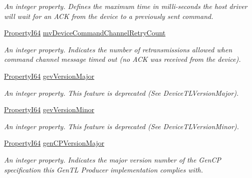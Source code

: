 \begin{DoxyCompactItemize}
\begin{DoxyCompactList}\small\item\em An integer property. Defines the maximum time in milli-\/seconds the host driver will wait for an A\+C\+K from the device to a previously sent command. \end{DoxyCompactList}\item 
\hyperlink{group___common_interface_ga81749b2696755513663492664a18a893}{Property\+I64} \hyperlink{classmv_i_m_p_a_c_t_1_1acquire_1_1_gen_i_cam_1_1_interface_module_aedcdf96599dc918cab683d9a9e915f64}{mv\+Device\+Command\+Channel\+Retry\+Count}
\begin{DoxyCompactList}\small\item\em An integer property. Indicates the number of retransmissions allowed when command channel message timed out (no A\+C\+K was received from the device). \end{DoxyCompactList}\item 
\hyperlink{group___common_interface_ga81749b2696755513663492664a18a893}{Property\+I64} \hyperlink{classmv_i_m_p_a_c_t_1_1acquire_1_1_gen_i_cam_1_1_interface_module_a7b2757e3dd747f119af3ad583dbf2aa8}{gev\+Version\+Major}
\begin{DoxyCompactList}\small\item\em An integer property. This feature is deprecated (See Device\+T\+L\+Version\+Major). \end{DoxyCompactList}\item 
\hyperlink{group___common_interface_ga81749b2696755513663492664a18a893}{Property\+I64} \hyperlink{classmv_i_m_p_a_c_t_1_1acquire_1_1_gen_i_cam_1_1_interface_module_ac9400d7c200c444e2788da0cbc87d7ec}{gev\+Version\+Minor}
\begin{DoxyCompactList}\small\item\em An integer property. This feature is deprecated (See Device\+T\+L\+Version\+Minor). \end{DoxyCompactList}\item 
\hyperlink{group___common_interface_ga81749b2696755513663492664a18a893}{Property\+I64} \hyperlink{classmv_i_m_p_a_c_t_1_1acquire_1_1_gen_i_cam_1_1_interface_module_a384d3a7d4dcc0b720b88f1c5ca731766}{gen\+C\+P\+Version\+Major}
\begin{DoxyCompactList}\small\item\em An integer property. Indicates the major version number of the Gen\+C\+P specification this Gen\+T\+L Producer implementation complies with. \end{DoxyCompactList}\item 

\end{DoxyCompactItemize}
